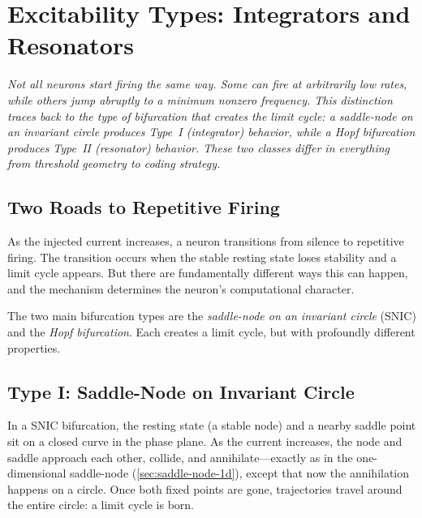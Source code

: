 \chapter{Excitability Types: Integrators and Resonators}
\label{ch:excitability}

\textit{Not all neurons start firing the same way. Some can fire at arbitrarily low rates, while others jump abruptly to a minimum nonzero frequency. This distinction traces back to the type of bifurcation that creates the limit cycle: a saddle-node on an invariant circle produces Type~I (integrator) behavior, while a Hopf bifurcation produces Type~II (resonator) behavior. These two classes differ in everything from threshold geometry to coding strategy.}

\section{Two Roads to Repetitive Firing}
\label{sec:two-roads}

As the injected current increases, a neuron transitions from silence to repetitive firing. The transition occurs when the stable resting state loses stability and a limit cycle appears. But there are fundamentally different ways this can happen, and the mechanism determines the neuron's computational character.

The two main bifurcation types are the \emph{saddle-node on an invariant circle} (SNIC) and the \emph{Hopf bifurcation}. Each creates a limit cycle, but with profoundly different properties.

\section{Type I: Saddle-Node on Invariant Circle}
\label{sec:type-1}

In a SNIC bifurcation, the resting state (a stable node) and a nearby saddle point sit on a closed curve in the phase plane. As the current increases, the node and saddle approach each other, collide, and annihilate---exactly as in the one-dimensional saddle-node (\cref{sec:saddle-node-1d}), except that now the annihilation happens on a circle. Once both fixed points are gone, trajectories travel around the entire circle: a limit cycle is born.

